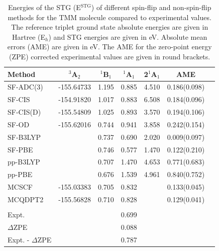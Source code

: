 \documentclass[aip,graphicx,amsmath,reprint]{revtex4-1}
\begin{document}
\begin{table}
\caption{\label{tab:tmm}Energies of the STG (E$^{{\text{STG}}}$) of different spin-flip and non-spin-flip methods for the TMM molecule compared to experimental values. The reference triplet ground state absolute energies are given in Hartree (E$_h$) and STG energies are given in eV. Absolute mean errors (AME) are given in eV. The AME for the zero-point energy (ZPE) corrected experimental values are given in round brackets.}
\begin{ruledtabular}
\begin{tabular}{lcccccc}
Method & $^3$A$_2$ & $^1$B$_1$ & $^1$A$_1$ & 2$^1$A$_1$&AME \\
\hline
SF-ADC(3)\footnotemark[1]&-155.64733&1.195&0.885&4.510&0.186(0.098)\\
SF-CIS\footnotemark[2]&-154.91820&1.017&0.883&6.508&0.184(0.096)\\
SF-CIS(D)\footnotemark[2]&-155.54809&1.025&0.893&3.570&0.194(0.106)\\
SF-OD\footnotemark[2]&-155.62016&0.744&0.941&3.858&0.242(0.154)\\
SF-B3LYP\footnotemark[3]&&0.737&0.690&2.020&0.009(0.097)\\
SF-PBE\footnotemark[3]&&0.746&0.577&1.470&0.122(0.210)\\
pp-B3LYP\footnotemark[4]&&0.707&1.470&4.653&0.771(0.683)\\
pp-PBE\footnotemark[4]&&0.676&1.539&4.961&0.840(0.752)\\
MCSCF\footnotemark[2]\footnotemark[5]\footnotemark[6]&-155.03383&0.705&0.832&&0.133(0.045)\\
MCQDPT2\footnotemark[2]\footnotemark[5]\footnotemark[6]&-155.56828&0.710&0.828&&0.129(0.041)\\
&&&&\\
Expt.\footnotemark[7]&&&0.699&\\
$\Delta$ZPE\footnotemark[8]&&&0.088&\\
Expt. - $\Delta$ZPE\footnotemark[8]&&&0.787&\\
\end{tabular}
\end{ruledtabular}
\end{table}
\end{document}
